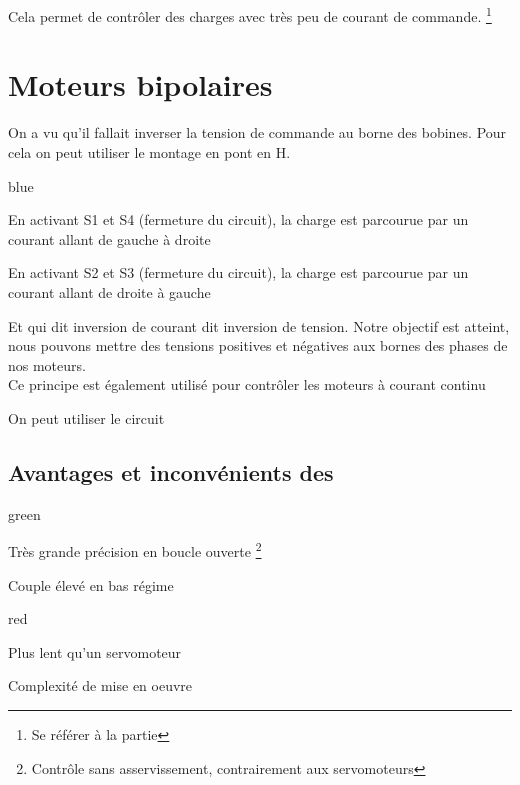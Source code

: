 Cela permet de contrôler des charges avec très peu de courant de commande. \footnote{Se référer à la partie }



\section{Moteurs bipolaires}

On a vu qu'il fallait inverser la tension de commande au borne des bobines. Pour cela on peut utiliser le montage en pont en H.


\begin{items}{blue}{\Bullet}
  \item En activant S1 et S4 (fermeture du circuit), la charge est parcourue par un courant allant de gauche à droite
  \item En activant S2 et S3 (fermeture du circuit), la charge est parcourue par un courant allant de droite à gauche
\end{items}

Et qui dit inversion de courant dit inversion de tension. Notre objectif est atteint, nous pouvons mettre des tensions positives 
et négatives aux bornes des phases de nos moteurs.\\

Ce principe est également utilisé pour contrôler les moteurs à courant continu

On peut utiliser le circuit 


\subsection{Avantages et inconvénients des \paps}

\begin{items}{green}{\Bullet}
    \item Très grande précision en boucle ouverte \footnote{Contrôle sans asservissement, contrairement aux servomoteurs}
    \item Couple élevé en bas régime
\end{items}

\begin{items}{red}{\Bullet}
  \item Plus lent qu'un servomoteur
  \item Complexité de mise en oeuvre
\end{items}


